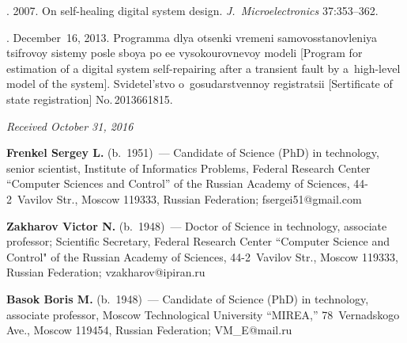 \begin{multicols}{2}
{{\begin{thebibliography}{99}
. 2007. On self-healing digital system design. 
\textit{J.~Microelectronics} 37:353--362.

. December~16, 2013. Programma dlya otsenki vremeni 
samovosstanovleniya tsifrovoy sistemy posle sboya po ee vysokourovnevoy modeli [Program for 
estimation of a digital system self-repairing after a transient fault by a~high-level model of the system]. 
Svidetel'stvo o~gosudarstvennoy registratsii [Sertificate of state registration] No.\,2013661815.
\end{thebibliography}

 }
 }

\end{multicols}

\vspace*{-3pt}

\hfill{\small\textit{Received October 31, 2016}}

\Contr

\noindent
\textbf{Frenkel Sergey L.} (b.\ 1951)~--- Candidate of Science (PhD) in technology, senior scientist, 
Institute of Informatics Problems, Federal Research Center ``Computer Sciences and Control'' of the 
Russian Academy of Sciences, 44-2~Vavilov Str., Moscow 119333, Russian Federation; 
\mbox{fsergei51@gmail.com}

\vspace*{3pt}

\noindent
\textbf{Zakharov Victor N.} (b.\ 1948)~--- Doctor of Science in technology, associate professor; Scientific 
Secretary, Federal Research Center ``Computer Science and Control" of the Russian Academy of Sciences, 
44-2~Vavilov Str., Moscow 119333, Russian Federation; \mbox{vzakharov@ipiran.ru}

\vspace*{3pt}

\noindent
\textbf{Basok Boris M.} (b.\ 1948)~--- Candidate of Science (PhD) in technology, associate professor, 
Moscow Technological University ``MIREA,'' 78~Vernadskogo Ave., Moscow 119454, Russian Federation; 
\mbox{VM\_E@mail.ru} 

\label{end\stat}


\renewcommand{\bibname}{\protect\rm Литература} 